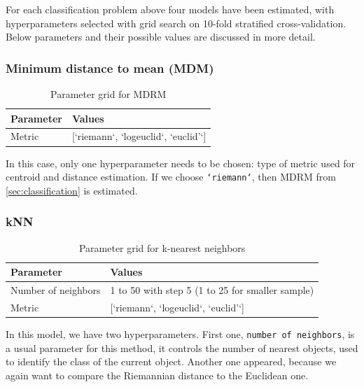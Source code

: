 \documentclass[12pt]{extarticle}
\theoremstyle{definition}
\theoremstyle{remark}
\begin{document}
	For each classification problem above four models have been estimated, with hyperparameters selected with grid search on 10-fold stratified cross-validation. Below parameters and their possible values are discussed in more detail.
	\subsubsection*{Minimum distance to mean (MDM)}
	\begin{table}[!h]
		\begin{center}
			\begin{tabular}{ l | l  }
				Parameter &  Values \\ \hline
				Metric &   [`riemann`, `logeuclid`, `euclid'`]\\  
			\end{tabular}
			\caption{Parameter grid for MDRM}
			\label{T:mdrm_par}
		\end{center}
	\end{table}
	
	In this case, only one hyperparameter needs to be chosen: type of metric used for centroid and distance estimation. If we choose \texttt{`riemann`}, then MDRM from \cref{sec:classification} is estimated. 
	
	\subsubsection*{kNN}
	
	\begin{table}[!h]
		\begin{center}
			\begin{tabular}{ l | l }
				Parameter &  Values \\ \hline
				Number of neighbors &   1 to 50 with step 5 (1 to 25 for smaller sample)\\ 
				Metric &   [`riemann`, `logeuclid`, `euclid'`]\\ 
			\end{tabular}
			\caption{Parameter grid for k-nearest neighbors}
			\label{T:kNN_par}
		\end{center}
	\end{table}
	
	In this model, we have two hyperparameters. First one, \texttt{number of neighbors}, is a usual parameter for this method, it controls the number of nearest objects, used to identify the class of the current object. Another one appeared, because we again want to compare the Riemannian distance to the Euclidean one.
	
\end{document}

